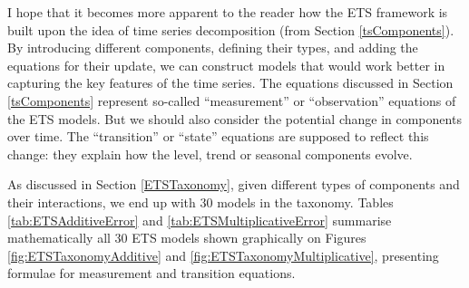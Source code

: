 \documentclass[
]{book}
\theoremstyle{definition}
\theoremstyle{definition}
\theoremstyle{definition}
\theoremstyle{definition}
\theoremstyle{remark}
\begin{document}
I hope that it becomes more apparent to the reader how the ETS framework is built upon the idea of time series decomposition (from Section \ref{tsComponents}). By introducing different components, defining their types, and adding the equations for their update, we can construct models that would work better in capturing the key features of the time series. The equations discussed in Section \ref{tsComponents} represent so-called ``measurement'' or ``observation'' equations of the ETS models. But we should also consider the potential change in components over time. The ``transition'' or ``state'' equations are supposed to reflect this change: they explain how the level, trend or seasonal components evolve.

As discussed in Section \ref{ETSTaxonomy}, given different types of components and their interactions, we end up with 30 models in the taxonomy. Tables \ref{tab:ETSAdditiveError} and \ref{tab:ETSMultiplicativeError} summarise mathematically all 30 ETS models shown graphically on Figures \ref{fig:ETSTaxonomyAdditive} and \ref{fig:ETSTaxonomyMultiplicative}, presenting formulae for measurement and transition equations.
\end{document}
